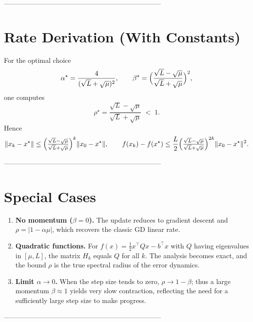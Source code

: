 \documentclass[11pt]{article}
\begin{document}
---------------------------------------------------------------------

\section*{Rate Derivation (With Constants)}
For the optimal choice
\[
\alpha^\star=\frac{4}{(\sqrt{L}+\sqrt{\mu})^{2}},\qquad
\beta^\star=\Bigl(\frac{\sqrt{L}-\sqrt{\mu}}{\sqrt{L}+\sqrt{\mu}}\Bigr)^{2},
\]
one computes
\[
\rho^\star = \frac{\sqrt{L}-\sqrt{\mu}}{\sqrt{L}+\sqrt{\mu}} \;<\;1 .
\]
Hence
\[
\|x_k-x^\star\|\le \Bigl(\tfrac{\sqrt{L}-\sqrt{\mu}}{\sqrt{L}+\sqrt{\mu}}\Bigr)^{k}\|x_0-x^\star\|,
\qquad
f(x_k)-f(x^\star)\le \frac{L}{2}\Bigl(\tfrac{\sqrt{L}-\sqrt{\mu}}{\sqrt{L}+\sqrt{\mu}}\Bigr)^{2k}\|x_0-x^\star\|^{2}.
\]

---------------------------------------------------------------------

\section*{Special Cases}
\begin{enumerate}
\item \textbf{No momentum ($\beta=0$).}  The update reduces to gradient descent and $\rho=|1-\alpha\mu|$, which recovers the classic GD linear rate.

\item \textbf{Quadratic functions.}  For $f(x)=\tfrac12 x^\top Q x-b^\top x$ with $Q$ having eigenvalues in $[\mu,L]$, the matrix $H_k$ equals $Q$ for all $k$.  The analysis becomes exact, and the bound $\rho$ is the true spectral radius of the error dynamics.

\item \textbf{Limit $\alpha\to 0$.}  When the step size tends to zero, $\rho\to 1-\beta$; thus a large momentum $\beta\approx 1$ yields very slow contraction, reflecting the need for a sufficiently large step size to make progress.
\end{enumerate}

---------------------------------------------------------------------
\end{document}
